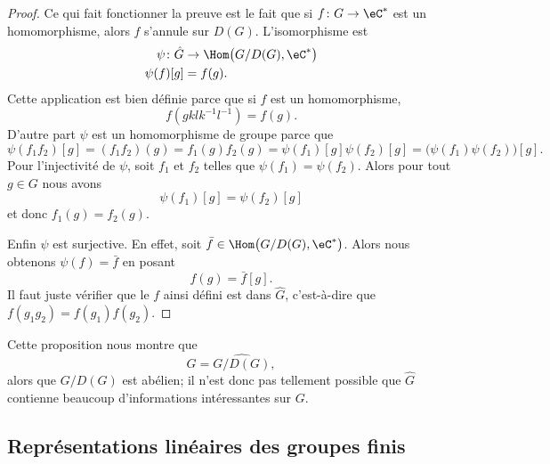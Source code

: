 \begin{proof}
	Ce qui fait fonctionner la preuve est le fait que si \( f\colon G\to \eC^*\) est un homomorphisme, alors \( f\) s'annule sur \( D(G)\). L'isomorphisme est
	\begin{equation}
		\begin{aligned}
			\psi\colon \hat G & \to \Hom\big( G/D(G),\eC^* \big) \\
			\psi(f)[g]        & =f(g).
		\end{aligned}
	\end{equation}
	Cette application est bien définie parce que si \( f\) est un homomorphisme,
	\begin{equation}
		f(gklk^{-1}l^{-1})=f(g).
	\end{equation}
	D'autre part \( \psi\) est un homomorphisme de groupe parce que
	\begin{equation}
		\psi(f_1f_2)[g]=(f_1f_2)(g)=f_1(g)f_2(g)=\psi(f_1)[g]\psi(f_2)[g]=\big( \psi(f_1)\psi(f_2) \big)[g].
	\end{equation}
	Pour l'injectivité de \( \psi\), soit \( f_1\) et \( f_2\) telles que \( \psi(f_1)=\psi(f_2)\). Alors pour tout \( g\in G\) nous avons
	\begin{equation}
		\psi(f_1)[g]=\psi(f_2)[g]
	\end{equation}
	et donc \( f_1(g)=f_2(g)\).

	Enfin \( \psi\) est surjective. En effet, soit \( \bar f\in\Hom\big( G/D(G),\eC^* \big)\). Alors nous obtenons \( \psi(f)=\bar f\) en posant
	\begin{equation}
		f(g)=\bar f[g].
	\end{equation}
	Il faut juste vérifier que le \( f\) ainsi défini est dans \( \hat G\), c'est-à-dire que \( f(g_1g_2)=f(g_1)f(g_2)\).
\end{proof}

Cette proposition nous montre que
\begin{equation}
	\hat G=\widehat{G/D(G)},
\end{equation}
alors que \( G/D(G)\) est abélien; il n'est donc pas tellement possible que \( \hat G\) contienne beaucoup d'informations intéressantes sur \( G\).

\subsection{Représentations linéaires des groupes finis}

